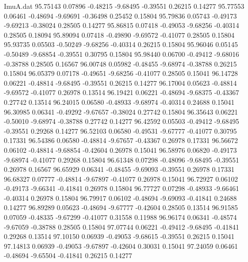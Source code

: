 \begin{filecontents}{ImuA.dat}
  95.75143    0.07896   -0.48215   -9.68495   -0.39551    0.26215    0.14277
  95.77553    0.06461   -0.48694   -9.69691   -0.36498    0.25452    0.15804
  95.79836    0.05743   -0.49173   -9.69213   -0.38024    0.28505    0.14277
  95.86815    0.07418   -0.49053   -9.68256   -0.40314    0.28505    0.18094
  95.89094    0.07418   -0.49890   -9.69572   -0.41077    0.28505    0.15804
  95.93735    0.05503   -0.50249   -9.68256   -0.40314    0.26215    0.15804
  95.96046    0.05145   -0.50489   -9.68854   -0.39551    0.30795    0.15804
  95.98440    0.06700   -0.49412   -9.68016   -0.38788    0.28505    0.16567
  96.00748    0.05982   -0.48455   -9.68974   -0.38788    0.26215    0.15804
  96.05379    0.07178   -0.49651   -9.68256   -0.41077    0.28505    0.15041
  96.14728    0.06221   -0.48814   -9.68495   -0.39551    0.26215    0.14277
  96.17004    0.05623   -0.48814   -9.69572   -0.41077    0.26978    0.13514
  96.19421    0.06221   -0.48694   -9.68375   -0.43367    0.27742    0.13514
  96.24015    0.06580   -0.48933   -9.68974   -0.40314    0.24688    0.15041
  96.30985    0.06341   -0.49292   -9.67657   -0.38024    0.27742    0.15804
  96.35643    0.06221   -0.50010   -9.68974   -0.38788    0.27742    0.14277
  96.42592    0.05503   -0.49412   -9.68495   -0.39551    0.29268    0.14277
  96.52103    0.06580   -0.49531   -9.67777   -0.41077    0.30795    0.17331
  96.54386    0.06580   -0.48814   -9.67657   -0.43367    0.26978    0.17331
  96.56672    0.06102   -0.48814   -9.68854   -0.42604    0.26978    0.15041
  96.58976    0.06820   -0.49173   -9.68974   -0.41077    0.29268    0.15804
  96.61348    0.07298   -0.48096   -9.68495   -0.39551    0.26978    0.16567
  96.65929    0.06341   -0.48455   -9.69093   -0.39551    0.26978    0.17331
  96.68327    0.07777   -0.48814   -9.67897   -0.41077    0.26978    0.15041
  96.72927    0.06102   -0.49173   -9.66341   -0.41841    0.26978    0.15804
  96.77727    0.07298   -0.48933   -9.66461   -0.40314    0.26978    0.15804
  96.79917    0.06102   -0.48694   -9.69093   -0.41841    0.24688    0.14277
  96.89289    0.05623   -0.48694   -9.67777   -0.42604    0.28505    0.13514
  96.91585    0.07059   -0.48335   -9.67299   -0.41077    0.31558    0.11988
  96.96174    0.06341   -0.48574   -9.67059   -0.38788    0.28505    0.15804
  97.07744    0.06221   -0.49412   -9.68495   -0.41841    0.29268    0.13514
  97.10150    0.06939   -0.49053   -9.68615   -0.39551    0.26215    0.15041
  97.14813    0.06939   -0.49053   -9.67897   -0.42604    0.30031    0.15041
  97.24059    0.06461   -0.48694   -9.65504   -0.41841    0.26215    0.14277

\end{filecontents}
